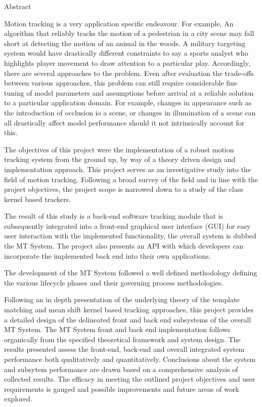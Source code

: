 \begin{centerpage}{Abstract}
 
Motion tracking is a very application specific endeavour. For example, An
    algorithm that reliably tracks the motion of a pedestrian in a city scene may fall
    short at detecting the motion of an animal in the woods. A military targeting
    system would have drastically different constraints to say a sports analyst
    who highlights player movement to draw attention to a particular play.
    Accordingly, there are several approaches to the problem. Even after evaluation
    the trade-offs between various approaches, this problem can still require
    considerable fine tuning of model parameters and assumptions before arrival at a
    reliable solution to a particular application domain. 
    For example, changes in appearance such as the introduction of occlusion io a scene, or changes in
    illumination of a scene can all drastically affect model performance should it
    not intrinsically account for this.

The objectives of this project were the implementation of a robust motion
    tracking system from the ground up, by way of a theory driven design and
    implementation approach. 
    This project serves as an investigative study into the field of motion tracking.
    Following a broad survey of the field and in line with the project objectives,
    the project scope is narrowed down to a study of the class kernel based
    trackers.
    
The result of this study is a back-end software tracking module that
    is subsequently integrated into a front-end graphical user interface (GUI) for easy
    user interaction with the implemented functionality, the overall system is
    dubbed the MT System. 
    The project also presents an API with which developers can incorporate the
    implemented back end into their own applications.

The development of the MT System followed a well defined methodology defining the various
    lifecycle phases and their governing process methodologies. 

Following an in depth presentation of the underlying theory of the template matching
    and mean shift kernel based tracking approaches, this project provides a
    detailed design of the delineated front and back end subsystems of the
    overall MT System. 
    The MT System front and back end implementation follows organically from the
    specified theoretical framework and system design. The results presented assess
    the front-end, back-end and overall integrated system performance both qualitatively and
    quantitatively. Conclusions about the system and subsytem performance are drawn based on a comprehensive
    analysis of collected results. The efficacy in meeting the outlined project
    objectives and user requirements is gauged and possible improvements and
    future areas of work explored.




\end{centerpage}
